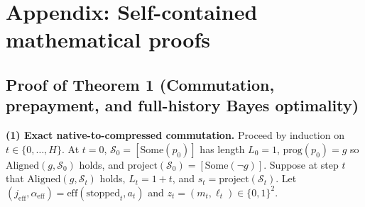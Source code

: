 \documentclass[11pt,a4paper]{article}
\begin{document}
\appendix

\section{Appendix: Self-contained mathematical
proofs}\label{appendix-self-contained-mathematical-proofs}

\subsection{Proof of Theorem 1 (Commutation, prepayment, and
full-history Bayes
optimality)}\label{proof-of-theorem-1-commutation-prepayment-and-full-history-bayes-optimality}

\textbf{(1) Exact native-to-compressed commutation.} Proceed by
induction on \(t \in \{0, \dots, H\}\). At \(t = 0\),
\(\mathcal{S}_0 = [\mathrm{Some}(p_0)]\) has length \(L_0 = 1\),
\(\mathrm{prog}(p_0) = g\) so \(\mathrm{Aligned}(g, \mathcal{S}_0)\)
holds, and
\(\mathrm{project}(\mathcal{S}_0) = [\mathrm{Some}(\neg g)]\). Suppose
at step \(t\) that \(\mathrm{Aligned}(g, \mathcal{S}_t)\) holds,
\(L_t = 1 + t\), and \(s_t = \mathrm{project}(\mathcal{S}_t)\). Let
\((j_{\mathrm{eff}}, \alpha_{\mathrm{eff}}) = \mathrm{eff}(\mathrm{stopped}_t, a_t)\)
and \(z_t = (m_t, \ell_t) \in \{0,1\}^2\).
\end{document}
